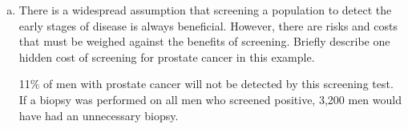 \begin{enumerate}[(a)]
\item There is a widespread assumption that screening a population to detect the early stages of disease is always beneficial.  However, there are risks and costs that must be weighed against the benefits of screening.  Briefly describe one hidden cost of screening for prostate cancer in this example. 

\begin{AnswerText}
11\% of men with prostate cancer will not be detected by this screening test.
If a biopsy was performed on all men who screened positive, 3,200 men would have had an unnecessary biopsy.
\end{AnswerText}

\end{enumerate}


